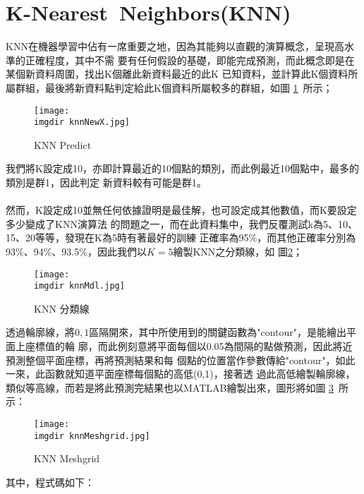 	\section{K-Nearest\ Neighbors(KNN)}
		KNN在機器學習中佔有一席重要之地，因為其能夠以直觀的演算概念，呈現高水準的正確程度，其中不需			要有任何假設的基礎，即能完成預測，而此概念即是在某個新資料周圍，找出K個離此新資料最近的此K			已知資料，並計算此K個資料所屬群組，最後將新資料點判定給此K個資料所屬較多的群組，如圖				\ref{fig:knnNewX}\ 所示；
		\begin{figure}[H]	
		 	\centering	 			 	 
   			\texttt{[image: \\imgdir knnNewX.jpg]} 
   			\caption{KNN Predict}   		
   		 	\label{fig:knnNewX}   			 		 
		\end{figure}
		我們將K設定成10，亦即計算最近的10個點的類別，而此例最近10個點中，最多的類別是群1，因此判定			新資料較有可能是群1。
		\\
		\\
		然而，K設定成10並無任何依據證明是最佳解，也可設定成其他數值，而K要設定多少變成了KNN演算法			的問題之一，而在此資料集中，我們反覆測試k為5、10、15、20等等，發現在K為5時有著最好的訓練			正確率為95\%，而其他正確率分別為93\%、94\%、93.5\%，因此我們以$K=5$繪製KNN之分類線，如			圖\ref{fig:knnMdl}；
		\begin{figure}[H]	
		 	\centering	 			 	 
   			\texttt{[image: \\imgdir knnMdl.jpg]} 
   			\caption{KNN 分類線}   		
   		 	\label{fig:knnMdl}   			 		 
		\end{figure}
		透過輪廓線，將$0,1$區隔開來，其中所使用到的關鍵函數為"contour"，是能繪出平面上座標值的輪			廓，而此例刻意將平面每個以0.05為間隔的點做預測，因此將近預測整個平面座標，再將預測結果和每			個點的位置當作參數傳給"contour"，如此一來，此函數就知道平面座標每個點的高低(0,1)，接著透			過此高低繪製輪廓線，類似等高線，而若是將此預測完結果也以MATLAB繪製出來，圖形將如圖					\ref{fig:knnMeshgrid}\ 所示：
		\begin{figure}[H]	
		 	\centering	 			 	 
   			\texttt{[image: \\imgdir knnMeshgrid.jpg]} 
   			\caption{KNN Meshgrid}   		
   		 	\label{fig:knnMeshgrid}   			 		 
		\end{figure}
		其中，程式碼如下：		
